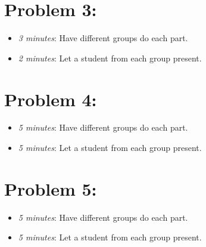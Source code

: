 \documentclass[handout,nooutcomes]{ximera}
\begin{document}
	
	
\section*{Problem 3:}

	\begin{itemize}
	
	\item  \emph{3 minutes}: Have different groups do each part.
	
	\item  \emph{2 minutes}: Let a student from each group present.
	
	\end{itemize}
	
	
	
\section*{Problem 4:}

	\begin{itemize}
	
	\item  \emph{5 minutes}: Have different groups do each part.
	
	\item  \emph{5 minutes}: Let a student from each group present.
	
	\end{itemize}
	
	
	
\section*{Problem 5:}

	\begin{itemize}
	
	\item  \emph{5 minutes}: Have different groups do each part.
	
	\item  \emph{5 minutes}: Let a student from each group present.
	
	\end{itemize}
\end{document}
